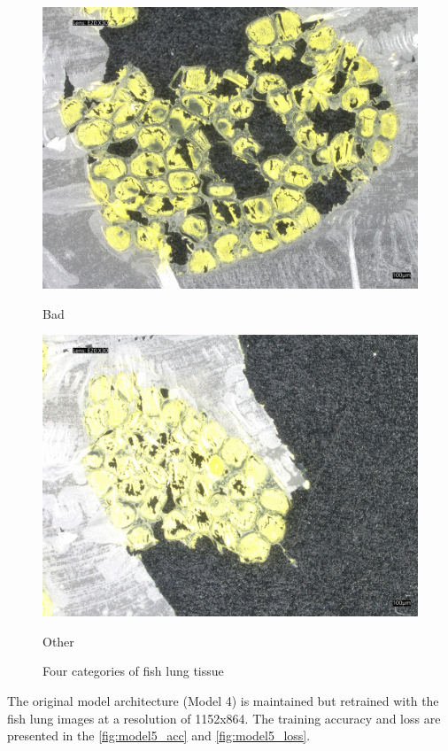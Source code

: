 \begin{figure}[H]
\begin{minipage}{0.24\textwidth}
        \centering
        \includegraphics[width=\textwidth]{./fig/fish_lung/bad20240313_140952.jpg}
        \caption*{Bad}
    \end{minipage}
    \begin{minipage}{0.24\textwidth}
        \centering
        \includegraphics[width=\textwidth]{./fig/fish_lung/other20240313_141858.jpg}
        \caption*{Other}
    \end{minipage}
    \caption{Four categories of fish lung tissue}
    \label{fig:fish_lung}
\end{figure}

The original model architecture (Model 4) is maintained but retrained with the fish lung images at a resolution of 1152x864. The training accuracy and loss are presented in the \autoref{fig:model5_acc} and \autoref{fig:model5_loss}.

